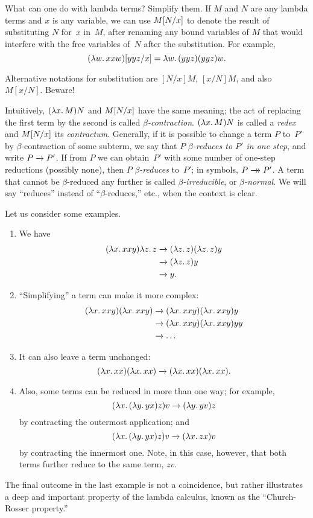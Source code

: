 \documentclass[../../../include/open-logic-section]{subfiles}
\begin{document}

What can one do with lambda terms? Simplify them. If $M$ and $N$ are
any lambda terms and $x$ is any variable, we can use $M[N/x]$ to
denote the result of substituting $N$ for~$x$ in~$M$, after renaming
any bound variables of $M$ that would interfere with the free
variables of~$N$ after the substitution. For example,
\[
\Subst{(\lambd[w][xxw])}{yyz}{x} = \lambd[w][(yyz)(yyz)w].
\]

\begin{digress}
Alternative notations for substitution are $[N/x]M$, $[x/N]M$, and
also $M[x/N]$. Beware!
\end{digress}

Intuitively, $(\lambd[x][M])N$ and $M[N/x]$ have the same
meaning; the act of replacing the first term by the second is called
\emph{$\beta$-contraction}. $(\lambd[x][M])N$ is called a \emph{redex}
and $M[N/x]$ its \emph{contractum}. Generally, if it is
possible to change a term $P$ to~$P'$ by $\beta$-contraction of some
subterm, we say that $P$ \emph{$\beta$-reduces to $P'$ in one step},
and write $P \redone P'$. If from $P$ we can obtain~$P'$ with some
number of one-step reductions (possibly none), then $P$
\emph{$\beta$-reduces} to~$P'$; in symbols, $P \red P'$. A term that
cannot be $\beta$-reduced any further is called
\emph{$\beta$-irreducible}, or \emph{$\beta$-normal}. We will say
``reduces'' instead of ``$\beta$-reduces,'' etc., when the context is
clear.

Let us consider some examples.
\begin{enumerate}
\item We have
\begin{align*}
(\lambd[x][xxy]) \lambd[z][z] & \redone (\lambd[z][z])(\lambd[z][z]) y \\
& \redone (\lambd[z][z]) y \\
& \redone y.
\end{align*}
\item ``Simplifying'' a term can make it more complex:
\begin{align*}
(\lambd[x][xxy])(\lambd[x][xxy]) & \redone (\lambd[x][xxy])(\lambd[x][xxy])y \\
& \redone (\lambd[x][xxy])(\lambd[x][xxy])yy \\
& \redone \dots
\end{align*}
\item It can also leave a term unchanged:
\[
(\lambd[x][xx])(\lambd[x][xx]) \redone (\lambd[x][xx])(\lambd[x][xx]).
\]
\item Also, some terms can be reduced in more than one way; for
  example,
\[
(\lambd[x][(\lambd[y][yx]) z)] v \redone (\lambd[y][yv]) z
\]
by contracting the outermost application; and
\[
(\lambd[x][(\lambd[y][yx]) z)] v \redone (\lambd[x][zx]) v
\]
by contracting the innermost one. Note, in this case, however, that
both terms further reduce to the same term, $zv$.
\end{enumerate}

The final outcome in the last example is not a coincidence, but rather
illustrates a deep and important property of the lambda calculus, known as the
``Church-Rosser property.''
\end{document}
